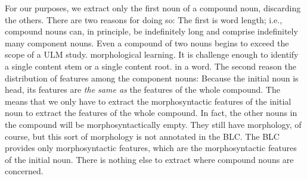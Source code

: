 
For our purposes, we extract only the first noun of a compound noun, discarding the others. %
There are two reasons for doing so: %
The first is word length; 
i.e., compound nouns can, in principle, be indefinitely long and comprise
indefinitely many component nouns. 
Even a compound of two nouns begins to exceed the scope of a ULM study. morphological learning. 
It is challenge enough to identify a single content stem or a single content root.  in a word. 
The second reason the distribution 
of features among the component nouns: Because the initial noun is head, its 
features are \emph{the same as} the features of the whole compound. The means that we only 
have to extract the morphosyntactic features of the initial noun to extract the features of the whole 
compound. In fact, the other nouns in the compound will be morphosyntactically empty. They still have
morphology, of course, but this sort of morphology is not annotated in the \ac{BLC}. The \ac{BLC} 
provides only morphosyntactic features, which are the morphosyntactic features of the initial noun. 
There is nothing else to extract where compound nouns are
concerned. %

